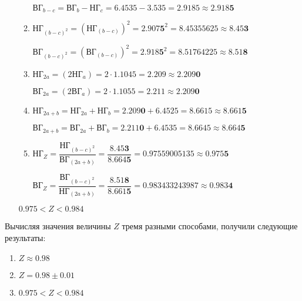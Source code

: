 \documentclass[a4paper, 14pt, fleqn]{extarticle}
\begin{document}
\begin{enumerate}
\begin{enumerate}[label*=\arabic*.]
						 \( \textrm{ВГ}_{b-c} = \textrm{ВГ}_{b} - \textrm{НГ}_{c} = 6.4535 - 3.535 = 2.9185 \approx 2.918\mathbf{5} \)

					\item \( \textrm{НГ}_{(b-c)^2} = (\textrm{НГ}_{(b-c)})^2  = 2.907\mathbf{5}^2 = 8.45355625 \approx 8.45\mathbf{3} \)

						 \( \textrm{ВГ}_{(b-c)^2} = (\textrm{ВГ}_{(b-c)})^2  = 2.918\mathbf{5}^2 = 8.51764225 \approx 8.51\mathbf{8} \)

					\item \( \textrm{НГ}_{2a} = (2\textrm{НГ}_{a})  = 2 \cdot 1.1045 = 2.209 \approx 2.209\mathbf{0} \)

						\( \textrm{ВГ}_{2a} = (2\textrm{ВГ}_{a})  = 2 \cdot 1.1055 = 2.211 \approx 2.209\mathbf{0} \)

					\item \( \textrm{НГ}_{2a+b} = \textrm{НГ}_{2a} + \textrm{НГ}_{b} = 2.209\mathbf{0} + 6.4525 = 8.6615 \approx 8.661\mathbf{5} \)

						 \( \textrm{ВГ}_{2a+b} = \textrm{ВГ}_{2a} + \textrm{ВГ}_{b} = 2.211\mathbf{0} + 6.4535 = 8.6645 \approx 8.664\mathbf{5} \)

					\item \( \textrm{НГ}_{Z} = \dfrac{\textrm{НГ}_{(b-c)^2}}{\textrm{ВГ}_{(2a+b)}} = \dfrac{8.45\mathbf{3}}{8.664\mathbf{5}} = 0.97559005135 \approx 0.975\mathbf{5} \)

						\( \textrm{ВГ}_{Z} = \dfrac{\textrm{ВГ}_{(b-c)^2}}{\textrm{НГ}_{(2a+b)}} = \dfrac{8.51\mathbf{8}}{8.661\mathbf{5}} = 0.983433243987 \approx 0.983\mathbf{4} \)
			\end{enumerate}
				
			\( 0.975 < Z < 0.984\)
		\end{enumerate}
		Вычисляя значения величины \( Z \) тремя разными способами, получили следующие результаты: 
		\begin{enumerate}
			\item \( Z \approx 0.98 \)
			\item \( Z = 0.98 \pm 0.01 \)
			\item \( 0.975 < Z < 0.984 \)
		\end{enumerate}
	
\end{document}
